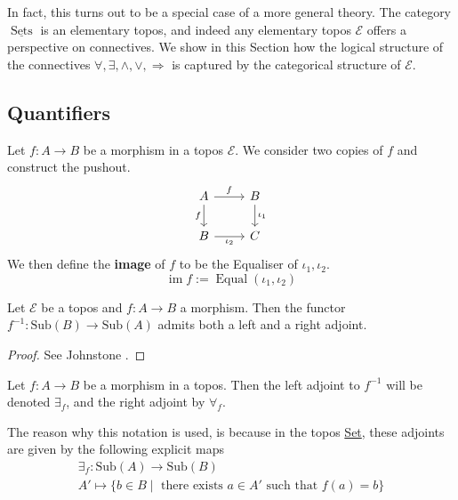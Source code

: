 \documentclass{tac}
\newcommand{\call}[1]{\mathcal{#1}}
\newcommand{\lto}{\longrightarrow}
\begin{document}
	In fact, this turns out to be a special case of a more general theory. The category $\underline{\operatorname{Sets}}$ is an elementary topos, and indeed any elementary topos $\call{E}$ offers a perspective on connectives. We show in this Section how the logical structure of the connectives $\forall, \exists, \wedge, \vee, \Rightarrow$ is captured by the categorical structure of $\call{E}$.
	\subsection{Quantifiers}
	\begin{definition}\label{def:image}
		Let $f: A \lto B$ be a morphism in a topos $\call{E}$. We consider two copies of $f$ and construct the pushout.
		\begin{equation}
			\begin{tikzcd}
				A\arrow[r,"{f}"]\arrow[d,swap,"{f}"] & B\arrow[d,"{\iota_1}"]\\
				B\arrow[r,swap,"{\iota_2}"] & C
			\end{tikzcd}
		\end{equation}
		We then define the \textbf{image} of $f$ to be the Equaliser of $\iota_1,\iota_2$.
		\begin{equation}
			\operatorname{im}f := \operatorname{Equal}(\iota_1,\iota_2)
		\end{equation}
	\end{definition}
	\begin{theorem}
		\label{adj}
		Let $\call{E}$ be a topos and $f:A \to B$ a morphism. Then the functor $f^{-1}: \text{Sub}(B) \to \text{Sub}(A)$ admits both a left and a right adjoint.
	\end{theorem}
	\begin{proof}
		See Johnstone \cite[\S A 1.4.10]{Johnstone}.
	\end{proof}
	\begin{definition}
		\label{qunatifiers}
		Let $f:A \to B$ be a morphism in a topos. Then the left adjoint to $f^{-1}$ will be denoted $\exists_f$, and the right adjoint by $\forall_f$.
	\end{definition}
	The reason why this notation is used, is because in the topos \underline{Set}, these adjoints are given by the following explicit maps
	\begin{gather*}
		\exists_f: \text{Sub}(A) \to \text{Sub}(B)\\
		A' \mapsto \lbrace b \in B \mid \text{ there exists }a \in A'\text{ such that }f(a) = b\rbrace
	\end{gather*}
\end{document}
